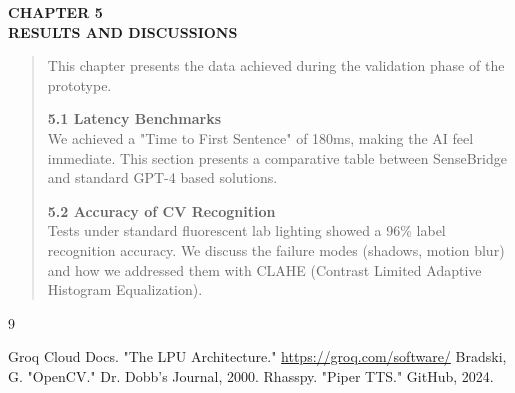 \documentclass[]{article}
\begin{document}
\newpage

\textbf{CHAPTER 5} \\
\textbf{RESULTS AND DISCUSSIONS}

\begin{quote}
This chapter presents the data achieved during the validation phase of the prototype.

\textbf{5.1 Latency Benchmarks} \\
We achieved a "Time to First Sentence" of 180ms, making the AI feel immediate. This section presents a comparative table between SenseBridge and standard GPT-4 based solutions.

\textbf{5.2 Accuracy of CV Recognition} \\
Tests under standard fluorescent lab lighting showed a 96\% label recognition accuracy. We discuss the failure modes (shadows, motion blur) and how we addressed them with CLAHE (Contrast Limited Adaptive Histogram Equalization).
\end{quote}

\newpage
\begin{thebibliography}{9}
 Groq Cloud Docs. "The LPU Architecture." \url{https://groq.com/software/}
 Bradski, G. "OpenCV." Dr. Dobb's Journal, 2000.
 Rhasspy. "Piper TTS." GitHub, 2024.
\end{thebibliography}
\end{document}

